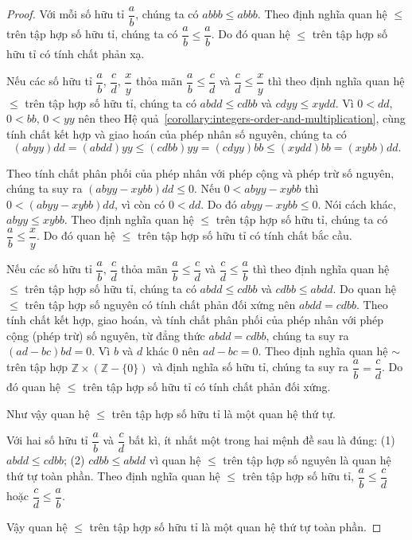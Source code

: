 \begin{proof}
    Với mỗi số hữu tỉ $\dfrac{a}{b}$, chúng ta có $abbb\leq abbb$. Theo định nghĩa quan hệ $\leq$ trên tập hợp số hữu tỉ, chúng ta có $\dfrac{a}{b}\leq\dfrac{a}{b}$. Do đó quan hệ $\leq$ trên tập hợp số hữu tỉ có tính chất phản xạ.

    Nếu các số hữu tỉ $\dfrac{a}{b}$, $\dfrac{c}{d}$, $\dfrac{x}{y}$ thỏa mãn $\dfrac{a}{b}\leq \dfrac{c}{d}$ và $\dfrac{c}{d}\leq\dfrac{x}{y}$ thì theo định nghĩa quan hệ $\leq$ trên tập hợp số hữu tỉ, chúng ta có $abdd \leq cdbb$ và $cdyy \leq xydd$. Vì $0 < dd$, $0 < bb$, $0 < yy$ nên theo Hệ quả~\ref{corollary:integers-order-and-multiplication}, cùng tính chất kết hợp và giao hoán của phép nhân số nguyên, chúng ta có
    \[
        (abyy)dd = (abdd)yy \leq (cdbb)yy = (cdyy)bb \leq (xydd)bb = (xybb)dd.
    \]

    Theo tính chất phân phối của phép nhân với phép cộng và phép trừ số nguyên, chúng ta suy ra $(abyy - xybb)dd\leq 0$. Nếu $0 < abyy - xybb$ thì $0 < (abyy - xybb)dd$, vì còn có $0 < dd$. Do đó $abyy - xybb \leq 0$. Nói cách khác, $abyy\leq xybb$. Theo định nghĩa quan hệ $\leq$ trên tập hợp số hữu tỉ, chúng ta có $\dfrac{a}{b}\leq \dfrac{x}{y}$. Do đó quan hệ $\leq$ trên tập hợp số hữu tỉ có tính chất bắc cầu.

    Nếu các số hữu tỉ $\dfrac{a}{b}$, $\dfrac{c}{d}$ thỏa mãn $\dfrac{a}{b}\leq \dfrac{c}{d}$ và $\dfrac{c}{d}\leq\dfrac{a}{b}$ thì theo định nghĩa quan hệ $\leq$ trên tập hợp số hữu tỉ, chúng ta có $abdd\leq cdbb$ và $cdbb\leq abdd$. Do quan hệ $\leq$ trên tập hợp số nguyên có tính chất phản đối xứng nên $abdd = cdbb$. Theo tính chất kết hợp, giao hoán, và tính chất phân phối của phép nhân với phép cộng (phép trừ) số nguyên, từ đẳng thức $abdd = cdbb$, chúng ta suy ra $(ad - bc)bd = 0$. Vì $b$ và $d$ khác $0$ nên $ad - bc = 0$. Theo định nghĩa quan hệ $\sim$ trên tập hợp $\mathbb{Z}\times(\mathbb{Z} - \{0\})$ và định nghĩa số hữu tỉ, chúng ta suy ra $\dfrac{a}{b} = \dfrac{c}{d}$. Do đó quan hệ $\leq$ trên tập hợp số hữu tỉ có tính chất phản đối xứng.

    Như vậy quan hệ $\leq$ trên tập hợp số hữu tỉ là một quan hệ thứ tự.

    Với hai số hữu tỉ $\dfrac{a}{b}$ và $\dfrac{c}{d}$ bất kì, ít nhất một trong hai mệnh đề sau là đúng: (1) $abdd \leq cdbb$; (2) $cdbb \leq abdd$ vì quan hệ $\leq$ trên tập hợp số nguyên là quan hệ thứ tự toàn phần. Theo định nghĩa quan hệ $\leq$ trên tập hợp số hữu tỉ, $\dfrac{a}{b}\leq\dfrac{c}{d}$ hoặc $\dfrac{c}{d}\leq\dfrac{a}{b}$.

    Vậy quan hệ $\leq$ trên tập hợp số hữu tỉ là một quan hệ thứ tự toàn phần.
\end{proof}

